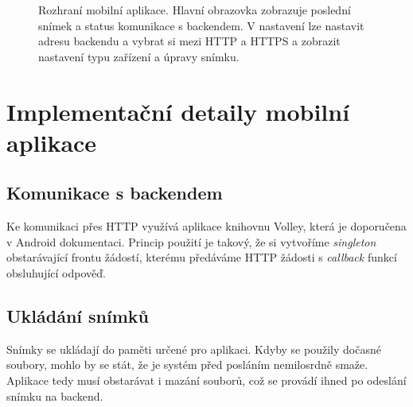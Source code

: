 \begin{figure}[!htb]
  \caption[Rozhraní mobilní aplikace.]{
    Rozhraní mobilní aplikace.
    Hlavní obrazovka zobrazuje poslední snímek a status komunikace s backendem.
    V nastavení lze nastavit adresu backendu a vybrat si mezi HTTP a HTTPS a
    zobrazit nastavení typu zařízení a úpravy snímku.}
  \label{fig:app_ui}
\end{figure}


\section{Implementační detaily mobilní aplikace}

\subsection{Komunikace s backendem}

\noindent
Ke komunikaci přes HTTP využívá aplikace knihovnu Volley, která je doporučena
v Android dokumentaci. Princip použití je takový, že si vytvoříme
\textit{singleton} obstarávající frontu žádostí, kterému předáváme HTTP žádosti s
\textit{callback} funkcí obsluhující odpověď. \citep[viz][]{Volley1}

\subsection{Ukládání snímků}

\noindent
Snímky se ukládají do paměti určené pro aplikaci. Kdyby se použily dočasné soubory,
mohlo by se stát, že je systém před posláním nemilosrdně smaže.
\citep[viz][]{AndroidMem}
Aplikace tedy musí obstarávat i mazání souborů, což se provádí
ihned po odeslání snímku na backend.

